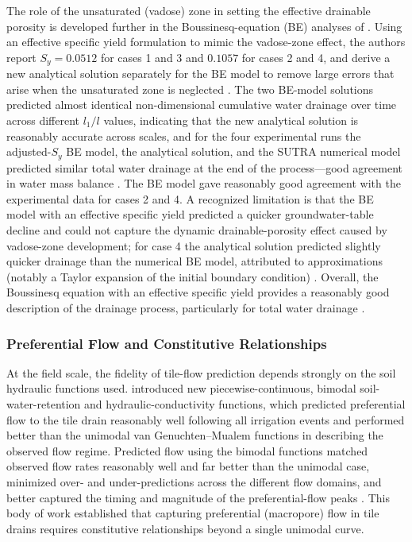 The role of the unsaturated (vadose) zone in setting the effective drainable porosity is
developed further in the Boussinesq-equation (BE) analyses of \textcite{Xin2016c}. Using
an effective specific yield formulation to mimic the vadose-zone effect, the authors
report $S_y = 0.0512$ for cases 1 and 3 and $0.1057$ for cases 2 and 4, and derive a new
analytical solution separately for the BE model to remove large errors that arise when the
unsaturated zone is neglected \parencite{Xin2016c}. The two BE-model solutions predicted
almost identical non-dimensional cumulative water drainage over time across different
$l_1/l$ values, indicating that the new analytical solution is reasonably accurate across
scales, and for the four experimental runs the adjusted-$S_y$ BE model, the analytical
solution, and the SUTRA numerical model predicted similar total water drainage at the end
of the process---good agreement in water mass balance \parencite{Xin2016c}. The BE model
gave reasonably good agreement with the experimental data for cases 2 and 4. A recognized
limitation is that the BE model with an effective specific yield predicted a quicker
groundwater-table decline and could not capture the dynamic drainable-porosity effect
caused by vadose-zone development; for case 4 the analytical solution predicted slightly
quicker drainage than the numerical BE model, attributed to approximations (notably a
Taylor expansion of the initial boundary condition) \parencite{Xin2016c}. Overall, the
Boussinesq equation with an effective specific yield provides a reasonably good
description of the drainage process, particularly for total water drainage
\parencite{Xin2016c}.

\subsubsection{Preferential Flow and Constitutive Relationships}

At the field scale, the fidelity of tile-flow prediction depends strongly on the soil
hydraulic functions used. \textcite{Mohanty1997} introduced new piecewise-continuous,
bimodal soil-water-retention and hydraulic-conductivity functions, which predicted
preferential flow to the tile drain reasonably well following all irrigation events and
performed better than the unimodal van Genuchten--Mualem functions in describing the
observed flow regime. Predicted flow using the bimodal functions matched observed flow
rates reasonably well and far better than the unimodal case, minimized over- and
under-predictions across the different flow domains, and better captured the timing and
magnitude of the preferential-flow peaks \parencite{Mohanty1997}. This body of work
established that capturing preferential (macropore) flow in tile drains requires
constitutive relationships beyond a single unimodal curve.

